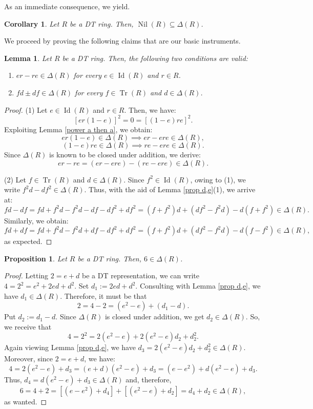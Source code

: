 \documentclass[12pt]{amsart}
\newtheorem{proposition}[theorem]{Proposition}
\newtheorem{lemma}[theorem]{Lemma}
\newtheorem{corollary}[theorem]{Corollary}
\theoremstyle{definition}
\begin{document}
As an immediate consequence, we yield.

\begin{corollary}
Let $R$ be a DT ring. Then, $\operatorname{Nil}(R) \subseteq \Delta(R)$.
\end{corollary}

We proceed by proving the following claims that are our basic instruments.

\begin{lemma}
Let $R$ be a DT ring. Then, the following two conditions are valid:
\begin{enumerate}
    \item $er - re \in \Delta(R)$ for every $e \in \operatorname{Id}(R)$ and $r \in R$.
    \item $fd \pm df \in \Delta(R)$ for every $f \in \operatorname{Tr}(R)$ and $d \in \Delta(R)$.
\end{enumerate}
\end{lemma}

\begin{proof}
(1) Let $e \in \operatorname{Id}(R)$ and $r \in R$. Then, we have:
\[
[er(1-e)]^2 = 0 = [(1-e)re]^2.
\]
Exploiting Lemma \ref{power a then a}, we obtain:
\[
er(1-e) \in \Delta(R) \implies er - ere \in \Delta(R),
\]
\[
(1-e)re \in \Delta(R) \implies re - ere \in \Delta(R).
\]
Since $\Delta(R)$ is known to be closed under addition, we derive:
\[
er - re = (er - ere) - (re - ere) \in \Delta(R).
\]

(2) Let $f \in \operatorname{Tr}(R)$ and $d \in \Delta(R)$. Since $f^2 \in \operatorname{Id}(R)$, owing to (1), we write $f^2d - df^2 \in \Delta(R)$. Thus, with the aid of Lemma \ref{prop d,e}(1), we arrive at:
\[
fd - df = fd + f^2d - f^2d - df - df^2 + df^2 = (f + f^2)d + (df^2 - f^2d) - d(f + f^2) \in \Delta(R).
\]
Similarly, we obtain:
\[
fd + df = fd + f^2d - f^2d + df - df^2 + df^2 = (f + f^2)d + (df^2 - f^2d) - d(f - f^2) \in \Delta(R),
\]
as expected.
\end{proof}

\begin{proposition}\label{6 in Delta}
Let $R$ be a DT ring. Then, $6 \in \Delta(R)$.
\end{proposition}

\begin{proof}
Letting $2 = e + d$ be a DT representation, we can write $4 = 2^2 = e^2 + 2ed + d^2$. Set $d_1 := 2ed + d^2$. Consulting with Lemma \ref{prop d,e}, we have $d_1 \in \Delta(R)$. Therefore, it must be that
\[
2 = 4 - 2 = (e^2 - e) + (d_1 - d).
\]
Put $d_2 := d_1 - d$. Since $\Delta(R)$ is closed under addition, we get $d_2 \in \Delta(R)$. So, we receive that
\[
4 = 2^2 = 2(e^2 - e) + 2(e^2 - e)d_2 + d_2^2.
\]
Again viewing Lemma \ref{prop d,e}, we have $d_3 = 2(e^2 - e)d_2 + d_2^2 \in \Delta(R)$. Moreover, since $2 = e + d$, we have:
\[
4 = 2(e^2 - e) + d_3 = (e + d)(e^2 - e) + d_3 = (e - e^2) + d(e^2 - e) + d_3.
\]
Thus, $d_4 = d(e^2 - e) + d_3 \in \Delta(R)$ and, therefore,
\[
6 = 4 + 2 = [(e - e^2) + d_4] + [(e^2 - e) + d_2] = d_4 + d_2 \in \Delta(R),
\]
as wanted.
\end{proof}
\end{document}

